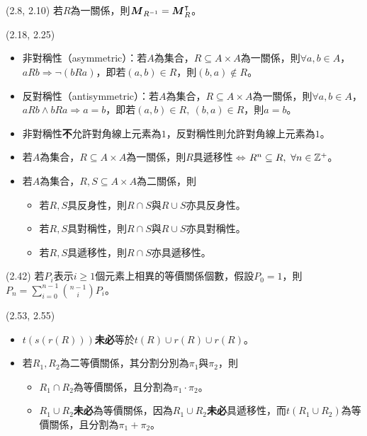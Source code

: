 \item \begin{theorem}{(2.8, 2.10)} 若$R$為一關係，則$\boldsymbol{M}_{R^{-1}} = \boldsymbol{M}_{R}^\intercal$。
\end{theorem}

\item \begin{theorem}{(2.18, 2.25)} \quad\quad
    \begin{itemize}
        \item 非對稱性（asymmetric）：若$A$為集合，$R \subseteq A \times A$為一關係，則$\forall a, b \in A$，$aRb \Rightarrow \lnot(bRa)$，即若$(a, b) \in R$，則$(b, a) \notin R$。
        \item 反對稱性（antisymmetric）：若$A$為集合，$R \subseteq A \times A$為一關係，則$\forall a, b \in A$，$aRb \land bRa \Rightarrow a = b$，即若$(a, b) \in R, \ (b, a) \in R$，則$a = b$。
        \item 非對稱性\textbf{不}允許對角線上元素為$1$，反對稱性則允許對角線上元素為$1$。
        \item 若$A$為集合，$R \subseteq A \times A$為一關係，則$R$具遞移性$\iff$$R^n \subseteq R, \ \forall n \in \mathbb{Z}^+$。
        \item 若$A$為集合，$R, S \subseteq A \times A$為二關係，則
        \begin{itemize}
            \item 若$R, S$具反身性，則$R \cap S$與$R \cup S$亦具反身性。
            \item 若$R, S$具對稱性，則$R \cap S$與$R \cup S$亦具對稱性。
            \item 若$R, S$具遞移性，則$R \cap S$亦具遞移性。
        \end{itemize}
    \end{itemize}
\end{theorem}

\item \begin{theorem}{(2.42)} 若$P_i$表示$i \ge 1$個元素上相異的等價關係個數，假設$P_0 = 1$，則$P_n = \sum_{i = 0}^{n - 1}\binom{n - 1}{i}P_i$。
\end{theorem}

\item \begin{theorem}{(2.53, 2.55)} \quad\quad
    \begin{itemize}
        \item $t(s(r(R)))$\textbf{未必}等於$t(R) \cup r(R) \cup r(R)$。
        \item 若$R_1, R_2$為二等價關係，其分割分別為$\pi_1$與$\pi_2$，則
            \begin{itemize}
                \item $R_1 \cap R_2$為等價關係，且分割為$\pi_1 \cdot \pi_2$。
                \item $R_1 \cup R_2$\textbf{未必}為等價關係，因為$R_1 \cup R_2$\textbf{未必}具遞移性，而$t(R_1 \cup R_2)$為等價關係，且分割為$\pi_1 + \pi_2$。
            \end{itemize}
    \end{itemize}
\end{theorem}

